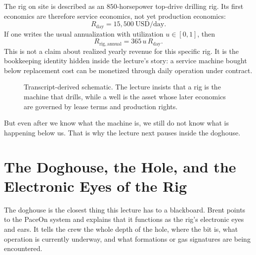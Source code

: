 The rig on site is described as an \(850\)-horsepower top-drive drilling rig. Its first economics are therefore service economics, not yet production economics:
\begin{equation}
R_{\mathrm{day}} = 15{,}500\ \mathrm{USD/day}.
\end{equation}
If one writes the usual annualization with utilization \(u \in [0,1]\), then
\begin{equation}
R_{\mathrm{rig,annual}} = 365\,u\,R_{\mathrm{day}}.
\end{equation}
This is not a claim about realized yearly revenue for this specific rig. It is the bookkeeping identity hidden inside the lecture's story: a service machine bought below replacement cost can be monetized through daily operation under contract.

\begin{figure}[h]
\centering
{}
\caption{Transcript-derived schematic. The lecture insists that a rig is the machine that drills, while a well is the asset whose later economics are governed by lease terms and production rights.}
\end{figure}

But even after we know what the machine is, we still do not know what is happening below us. That is why the lecture next pauses inside the doghouse.

\section{The Doghouse, the Hole, and the Electronic Eyes of the Rig}

The doghouse is the closest thing this lecture has to a blackboard. Brent points to the PaceOn system and explains that it functions as the rig's electronic eyes and ears. It tells the crew the whole depth of the hole, where the bit is, what operation is currently underway, and what formations or gas signatures are being encountered.


